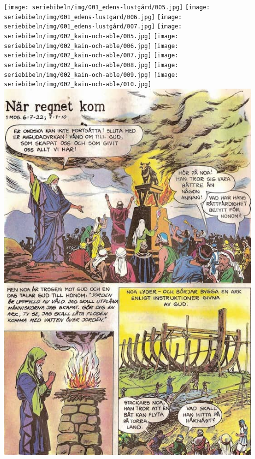 \texttt{[image: seriebibeln/img/001\_edens-lustgård/005.jpg]}
\texttt{[image: seriebibeln/img/001\_edens-lustgård/006.jpg]}
\texttt{[image: seriebibeln/img/001\_edens-lustgård/007.jpg]}
\texttt{[image: seriebibeln/img/002\_kain-och-able/005.jpg]}
\texttt{[image: seriebibeln/img/002\_kain-och-able/006.jpg]}
\texttt{[image: seriebibeln/img/002\_kain-och-able/007.jpg]}
\texttt{[image: seriebibeln/img/002\_kain-och-able/008.jpg]}
\texttt{[image: seriebibeln/img/002\_kain-och-able/009.jpg]}
\texttt{[image: seriebibeln/img/002\_kain-och-able/010.jpg]}
\includegraphics[width=\textwidth]{seriebibeln/img/003_noa/005.jpg}
